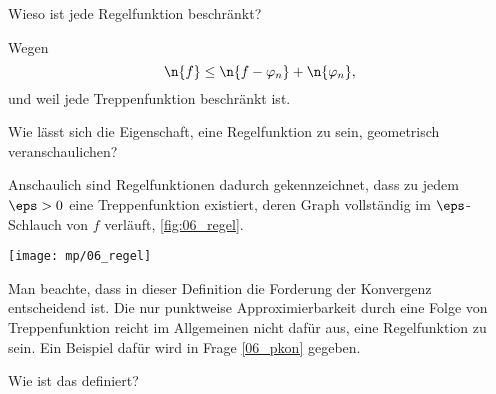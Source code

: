 \smallskip
\begin{frage}
Wieso ist jede Regelfunktion beschränkt?
\end{frage}

\begin{antwort}
Wegen 
\[
\n{f} \le \n{f-\varphi_n}+\n{\varphi_n},
\] 
und weil jede Treppenfunktion beschränkt ist.
\AntEnd
\end{antwort}



\begin{frage}
Wie lässt sich die Eigenschaft, eine Regelfunktion zu sein, 
geometrisch veranschaulichen?
\end{frage}


\begin{antwort}
Anschaulich sind Regelfunktionen dadurch gekennzeichnet, 
dass zu jedem $\eps>0$ eine Treppenfunktion existiert, deren Graph 
vollständig im $\eps$-Schlauch von $f$ verläuft, 
\sieheAbbildung\ref{fig:06_regel}. 

\begin{center}
  \texttt{[image: mp/06\_regel]}
  \label{fig:06_regel}
\end{center}

Man beachte, dass in dieser Definition die Forderung 
der  Konvergenz entscheidend ist. 
Die nur punktweise 
Approximierbarkeit durch eine Folge von Treppenfunktion 
reicht im Allgemeinen nicht dafür aus, eine Regelfunktion zu sein. 
Ein Beispiel dafür wird in Frage \ref{06_pkon} gegeben. 
\AntEnd
\end{antwort}

\begin{frage}
Wie ist das  definiert?  
\end{frage}
  

